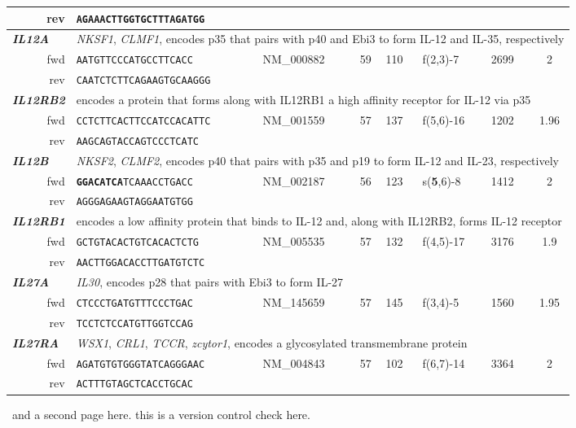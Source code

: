 \documentclass[12pt,a4paper]{scrreprt} %
\begin{document}
\begin{table}[h]
{\begin{tabular}{rllclllc}
\ rev & \texttt{AGAAACTTGGTGCTTTAGATGG} &  &  &  &  &  &  \\ 
\hline \multicolumn{1}{l}{\textit{\textbf{IL12A}}} & \multicolumn{7}{l}{\textit{NKSF1}, \textit{CLMF1}, encodes p35 that pairs with p40 and Ebi3 to form IL-12 and IL-35, respectively} \\ 
\ fwd & \texttt{AATGTTCCCATGCCTTCACC} & NM\_000882 & 59 & 110 & f(2,3)-7 & 2699 & 2 \\ 
\ rev & \texttt{CAATCTCTTCAGAAGTGCAAGGG} &  &  &  &  &  &  \\ 
\hline \multicolumn{1}{l}{\textit{\textbf{IL12RB2}}} & \multicolumn{7}{l}{encodes a protein that forms along with IL12RB1 a high affinity receptor for IL-12 via p35} \\ 
\ fwd & \texttt{CCTCTTCACTTCCATCCACATTC} & NM\_001559 & 57 & 137 & f(5,6)-16 & 1202 & 1.96 \\ 
\ rev & \texttt{AAGCAGTACCAGTCCCTCATC} &  &  &  &  &  &  \\ 
\hline \multicolumn{1}{l}{\textit{\textbf{IL12B}}} & \multicolumn{7}{l}{\textit{NKSF2}, \textit{CLMF2}, encodes p40 that pairs with p35 and p19 to form IL-12 and IL-23, respectively} \\ 
\ fwd & \texttt{\textbf{GGACATCA}TCAAACCTGACC} & NM\_002187 & 56 & 123 & s(\textbf{5},6)-8 & 1412 & 2 \\ 
\ rev & \texttt{AGGGAGAAGTAGGAATGTGG} &  &  &  &  &  &  \\ 
\hline \multicolumn{1}{l}{\textit{\textbf{IL12RB1}}} & \multicolumn{7}{l}{encodes a low affinity protein that binds to IL-12 and, along with IL12RB2, forms IL-12 receptor} \\ 
\ fwd & \texttt{GCTGTACACTGTCACACTCTG} & NM\_005535 & 57 & 132 & f(4,5)-17 & 3176 & 1.9 \\ 
\ rev & \texttt{AACTTGGACACCTTGATGTCTC} &  &  &  &  &  &  \\ 
\hline \multicolumn{1}{l}{\textit{\textbf{IL27A}}} & \multicolumn{7}{l}{\textit{IL30}, encodes p28 that pairs with Ebi3 to form IL-27} \\ 
\ fwd & \texttt{CTCCCTGATGTTTCCCTGAC} & NM\_145659 & 57 & 145 & f(3,4)-5 & 1560 & 1.95 \\ 
\ rev & \texttt{TCCTCTCCATGTTGGTCCAG} &  &  &  &  &  &  \\ 
\hline \multicolumn{1}{l}{\textit{\textbf{IL27RA}}} & \multicolumn{7}{l}{\textit{WSX1}, \textit{CRL1}, \textit{TCCR}, \textit{zcytor1}, encodes a glycosylated transmembrane protein} \\ 
\ fwd & \texttt{AGATGTGTGGGTATCAGGGAAC} & NM\_004843 & 57 & 102 & f(6,7)-14 & 3364 & 2 \\ 
\ rev & \texttt{ACTTTGTAGCTCACCTGCAC} &  &  &  &  &  &  \\ 
\bottomrule
\end{tabular} }
\end{table}
\newpage
\ and a second page here. this is a version control check here.
\end{document}

